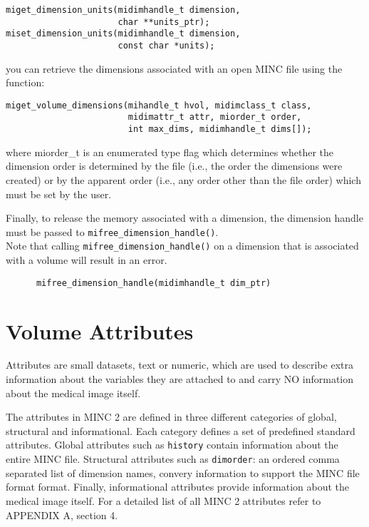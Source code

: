 \documentclass{article}
\begin{document}
\begin{verbatim}
miget_dimension_units(midimhandle_t dimension, 
                      char **units_ptr);
miset_dimension_units(midimhandle_t dimension, 
                      const char *units);
\end{verbatim}

you can retrieve the dimensions associated with an open MINC file using
the function:\\

\begin{verbatim}
miget_volume_dimensions(mihandle_t hvol, midimclass_t class,
                        midimattr_t attr, miorder_t order,
                        int max_dims, midimhandle_t dims[]);
\end{verbatim}
   
where miorder\_t is an enumerated type flag which determines whether the
dimension order is determined by the file (i.e., the order the dimensions
were created) or by the apparent order (i.e., any order other than the file
order) which must be set by the user.       
     
Finally, to release the memory associated with a dimension, 
the dimension handle must be passed to {\tt mifree\_dimension\_handle()}.\\
Note that calling {\tt mifree\_dimension\_handle()} on a 
dimension that is associated with a volume will result in an error. 

\begin{verbatim}
      mifree_dimension_handle(midimhandle_t dim_ptr)

\end{verbatim}

\section{Volume Attributes}
Attributes are small datasets, text or numeric, which are used to describe extra information about 
the variables they are attached to and carry NO information about the medical image itself.

The attributes in MINC 2 are defined in three different categories of
global, structural and informational. Each category defines a set of predefined standard 
attributes. Global attributes such as 
{\tt history} contain information about the entire MINC file. Structural attributes such 
as {\tt dimorder}: an ordered comma separated list of dimension names, 
convery information to support the MINC file format format. Finally, informational attributes
provide information about the medical image itself. For a detailed list of
all MINC 2 attributes refer to APPENDIX A, section 4.
 
\end{document}
